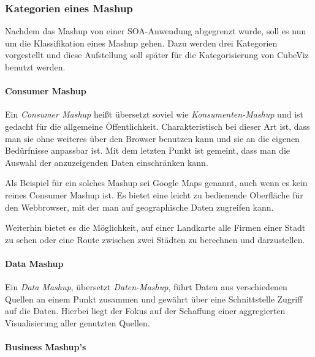 \documentclass[11pt]{article}
\newcommand{\com}[1]{\marginpar{\em {\small{#1}}}} %
\begin{document}
%
%
\subsubsection{Kategorien eines Mashup}

Nachdem das Mashup von einer SOA-Anwendung abgegrenzt wurde, soll es nun um die Klassifikation eines Mashup gehen. Dazu werden drei Kategorien vorgestellt und diese Aufstellung soll später für die Kategorisierung von CubeViz benutzt werden.

%
%
\paragraph{Consumer Mashup}

Ein \emph{Consumer Mashup}\com{Konsumenten-Mashup} heißt übersetzt soviel wie \textit{Konsumenten-Mashup} und ist gedacht für die allgemeine Öffentlichkeit. Charakteristisch bei dieser Art ist, dass man sie ohne weiteres über den Browser benutzen kann und sie an die eigenen Bedürfnisse anpassbar ist. Mit dem letzten Punkt ist gemeint, dass man die Auswahl der anzuzeigenden Daten einschränken kann. \cite[S. 2]{MASHUP-AND-ENTERP}

Als Beispiel für ein solches Mashup sei Google Maps genannt, auch wenn es kein reines Consumer Mashup ist. Es bietet eine leicht zu bedienende Oberfläche für den Webbrowser, mit der man auf geographische Daten zugreifen kann. 


\newpage 
\noindent
Weiterhin bietet es die Möglichkeit, auf einer Landkarte alle Firmen einer Stadt zu sehen oder eine Route zwischen zwei Städten zu berechnen und darzustellen. \cite[S. 3]{GOOGLE-MAPS}


%
%
\paragraph{Data Mashup}

Ein \emph{Data Mashup},\com{Daten-\\Mashup} übersetzt \textit{Daten-Mashup}, führt Daten aus verschiedenen Quellen an einem Punkt zusammen und gewährt über eine Schnittstelle Zugriff auf die Daten. Hierbei liegt der Fokus auf der Schaffung einer aggregierten Visualisierung aller genutzten Quellen. \cite[S. 2]{MASHUP-AND-ENTERP} 

%
%
\paragraph{Business Mashup's}
\end{document}
